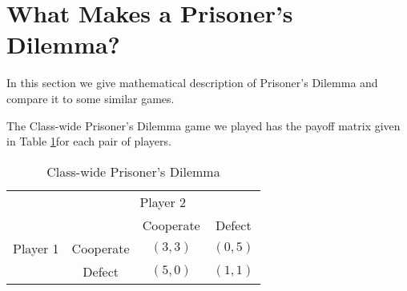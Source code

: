 
\section{What Makes a Prisoner's Dilemma?}\label{S:PDconditions}



In this section we give mathematical description of Prisoner's Dilemma and compare it to some similar games.

The Class-wide Prisoner's Dilemma game we played has the payoff matrix  given in Table \ref{T:CWPD}for each pair of players.
 


\begin{table}[h]
\centering

\begin{tabular}{cccc}
                      & \multicolumn{3}{c}{Player 2}                                                  \\ \cline{2-4} 
\multicolumn{1}{l|}{} & \multicolumn{1}{l|}{} & \multicolumn{1}{c|}{Cooperate} & \multicolumn{1}{c|}{Defect} \\ \cline{2-4} 
\multicolumn{1}{l|}{Player 1} & \multicolumn{1}{c|}{Cooperate} & \multicolumn{1}{c|}{$(3, 3)$} & \multicolumn{1}{c|}{$(0, 5)$} \\ \cline{2-4} 
\multicolumn{1}{l|}{} & \multicolumn{1}{c|}{Defect} & \multicolumn{1}{c|}{$(5, 0)$} & \multicolumn{1}{c|}{$(1, 1)$} \\ \cline{2-4} 
\end{tabular}
\caption{Class-wide Prisoner's Dilemma}
\label{T:CWPD}
\end{table}

